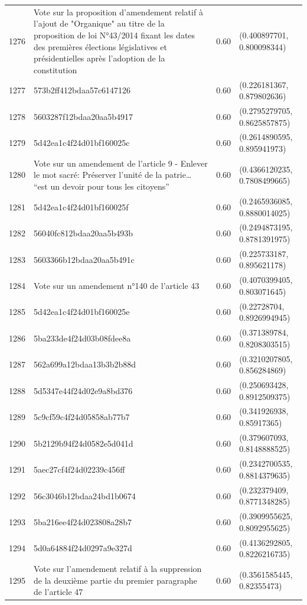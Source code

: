 \begin{table}[ht]
\begin{tabular}{rlrl}
  1276 & Vote sur la proposition d'amendement relatif à l'ajout de "Organique" au titre de la proposition de loi N°43/2014 fixant les dates des premières élections législatives et présidentielles après l'adoption de la constitution & 0.60 & (0.400897701, 0.800098344) \\ 
  1277 & 573b2ff412bdaa57c6147126 & 0.60 & (0.226181367, 0.879802636) \\ 
  1278 & 5603287f12bdaa20aa5b4917 & 0.60 & (0.2795279705, 0.8625857875) \\ 
  1279 & 5d42ea1c4f24d01bf160025c & 0.60 & (0.2614890595, 0.895941973) \\ 
  1280 & Vote sur un amendement de l'article 9 - Enlever le mot sacré: Préserver l’unité de la patrie… “est un devoir pour tous les citoyens” & 0.60 & (0.4366120235, 0.7808499665) \\ 
  1281 & 5d42ea1c4f24d01bf160025f & 0.60 & (0.2465936085, 0.8880014025) \\ 
  1282 & 56040fc812bdaa20aa5b493b & 0.60 & (0.2494873195, 0.8781391975) \\ 
  1283 & 5603366b12bdaa20aa5b491c & 0.60 & (0.225733187, 0.895621178) \\ 
  1284 & Vote sur un amendement n°140 de l'article 43 & 0.60 & (0.4070399405, 0.803071645) \\ 
  1285 & 5d42ea1c4f24d01bf160025e & 0.60 & (0.22728704, 0.8926994945) \\ 
  1286 & 5ba233de4f24d03b08fdee8a & 0.60 & (0.371389784, 0.8208303515) \\ 
  1287 & 562a699a12bdaa13b3b2b88d & 0.60 & (0.3210207805, 0.856284869) \\ 
  1288 & 5d5347e44f24d02e9a8bd376 & 0.60 & (0.250693428, 0.8912509375) \\ 
  1289 & 5c9cf59c4f24d05858ab77b7 & 0.60 & (0.341926938, 0.85917365) \\ 
  1290 & 5b2129b94f24d0582e5d041d & 0.60 & (0.379607093, 0.8148888525) \\ 
  1291 & 5aec27cf4f24d02239c456ff & 0.60 & (0.2342700535, 0.8814379635) \\ 
  1292 & 56c3046b12bdaa24bd1b0674 & 0.60 & (0.232379409, 0.8771348285) \\ 
  1293 & 5ba216ee4f24d023808a28b7 & 0.60 & (0.3909955625, 0.8092955625) \\ 
  1294 & 5d0a64884f24d0297a9e327d & 0.60 & (0.4136292805, 0.8226216735) \\ 
  1295 & Vote sur l'amendement relatif à la suppression de la deuxième partie du premier paragraphe de l'article 47 & 0.60 & (0.3561585445, 0.82355473) \\ 

\end{tabular}
\end{table}

